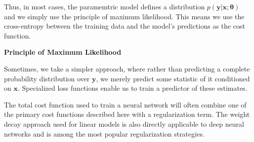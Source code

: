 Thus, in most cases, the paramemtric model defines a distribution $p(\mathbf{y} | \mathbf{x}; \boldsymbol{\theta})$ and we simply
use the principle of maximum likelihood. This means we use the
cross-entropy between the training data and the model’s predictions as the cost function.


\begin{framed}
\begin{remark}{\textbf{Principle of Maximum Likelihood}}
\end{remark}
\end{framed} 

Sometimes, we take a simpler approach, where rather than predicting a complete
probability distribution over $\mathbf{y}$, we merely predict some statistic of
it  conditioned on $\mathbf{x}$. Specialized loss functions enable us to train a predictor of these estimates.

The total cost function used to train a neural network will often combine one
of the primary cost functions described here with a regularization term. 
The weight decay approach used for linear models is also directly
applicable to deep neural networks and is among the most popular regularization strategies.
